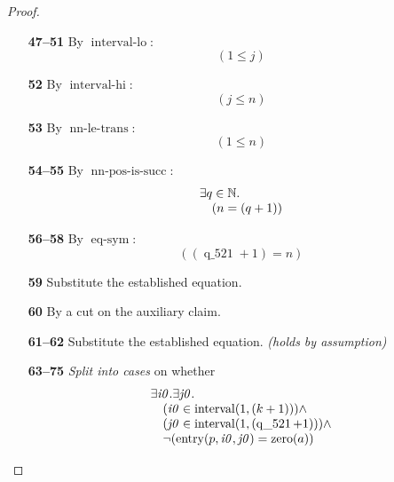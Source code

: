 \documentclass[11pt]{article}
\theoremstyle{plain}
\begin{document}
\begin{proof}
\begin{itemize}[leftmargin=2.8em, itemsep=4pt, parsep=1pt]
  \item[\textbf{47--51}] By $\operatorname{interval\text{-}lo}$:
\begin{equation*}
(1 \leq j)
\end{equation*}

  \item[\textbf{52}] By $\operatorname{interval\text{-}hi}$:
\begin{equation*}
(j \leq n)
\end{equation*}

  \item[\textbf{53}] By $\operatorname{nn\text{-}le\text{-}trans}$:
\begin{equation*}
(1 \leq n)
\end{equation*}

  \item[\textbf{54--55}] By $\operatorname{nn\text{-}pos\text{-}is\text{-}succ}$:
\begin{equation*}
\begin{array}{@{}l@{}} \exists q \in \mathbb{N}. \\ \quad (n = (q + 1)) \end{array}
\end{equation*}

  \item[\textbf{56--58}] By $\operatorname{eq\text{-}sym}$:
\begin{equation*}
((\operatorname{q\_521} + 1) = n)
\end{equation*}

  \item[\textbf{59}] Substitute the established equation.
  \item[\textbf{60}] By a cut on the auxiliary claim.
  \item[\textbf{61--62}] Substitute the established equation.  \emph{(holds by assumption)}
  \item[\textbf{63--75}] \emph{Split into cases} on whether
\begin{equation*}
\begin{array}{@{}l@{}} \exists \mathit{i0}. \exists \mathit{j0}. \\ \quad (\mathit{i0} \in \operatorname{interval}(1, (k + 1))) \wedge \\ \quad (\mathit{j0} \in \operatorname{interval}(1, (\operatorname{q\_521} + 1))) \wedge \\ \quad \neg (\operatorname{entry}(p, \mathit{i0}, \mathit{j0}) = \operatorname{zero}(a)) \end{array}
\end{equation*}


\end{itemize}
\end{proof}
\end{document}
